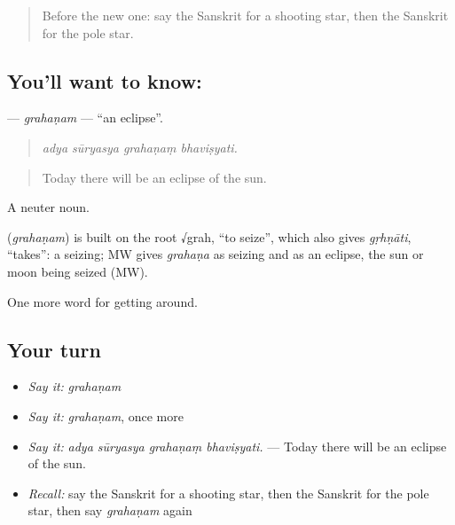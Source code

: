 \label{lesson:SA-C445-grahanam}



\begin{quote}
Before the new one: say the Sanskrit for a shooting star, then the Sanskrit for the pole star.
\end{quote}

\subsection*{You'll want to know: }
\textbf{} — \emph{grahaṇam} — \textquotedblleft{}an eclipse\textquotedblright{}.

\begin{quote}
   
\end{quote}

\begin{quote}
\emph{adya sūryasya grahaṇaṃ bhaviṣyati.}
\end{quote}

\begin{quote}
Today there will be an eclipse of the sun.
\end{quote}

A neuter noun.

\begin{cousinweb}
\textbf{} (\emph{grahaṇam}) is built on the root √grah, \textquotedblleft{}to seize\textquotedblright{}, which also gives \emph{gṛhṇāti}, \textquotedblleft{}takes\textquotedblright{}: a seizing; MW gives \emph{grahaṇa} as seizing and as an eclipse, the sun or moon being seized (MW).
\end{cousinweb}

\begin{grammarlens}[title={What you've built}]
One more word for getting around.
\end{grammarlens}

\subsection*{Your turn}
\begin{itemize}
\raggedright
  \item \emph{Say it:} \emph{grahaṇam}
  \item \emph{Say it:} \emph{grahaṇam}, once more
  \item \emph{Say it:} \emph{adya sūryasya grahaṇaṃ bhaviṣyati.} — Today there will be an eclipse of the sun.
  \item \emph{Recall:} say the Sanskrit for a shooting star, then the Sanskrit for the pole star, then say \emph{grahaṇam} again
\end{itemize}

